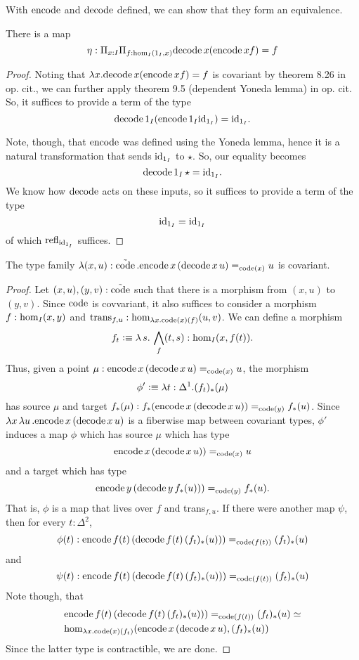 \documentclass[main.tex]{subfiles}
\begin{document}
With $\eco$ and $\dco$ defined, we can show that they form an equivalence.

\begin{lemma}
    There is a map 
    $$ \eta : \Pi_{x : I} \Pi_{f : \ho[I]{1_I}{x}} \normalfont \dco \, x (\eco \, x f) = f$$
\end{lemma}
\begin{proof}
Noting that $\lambda x .\dco \, x (\eco \, x f) = f$ is covariant by theorem 8.26 in op. cit., we can further apply theorem 9.5 (dependent Yoneda lemma) in op. cit. So, it suffices to provide a term of the type
$$\dco \, 1_I (\eco \, 1_I \id{1_I}) = \id{1_I}.$$

Note, though, that $\eco$ was defined using the Yoneda lemma, hence it is a natural transformation that sends $\id{1_I}$ to $\star$. So, our equality becomes $$
\dco \, 1_I \, \star = \id{1_I}.$$ We know how $\dco$ acts on these inputs, so it suffices to provide a term of the type
$$\id{1_I} = \id{1_I}$$
of which $\refl{\id{1_I}}$ suffices.
\end{proof}
\begin{lemma}
    The type family $\normalfont \lambda (x,u) : \tilde{\co}\,. \eco \, x \, (\dco \, x \,u)=_{\co(x)} u$ is covariant.
\end{lemma}
\begin{proof}
    Let $(x,u),(y,v) : \tilde{\co}$ such that there is a morphism from $(x,u)$ to $(y,v)$. Since $\co$ is covvariant, it also suffices to consider a morphism $f : \ho[I]{x}{y}$ and $\text{trans}_{f,u} : \ho[\lambda x. \co(x)(f)]{u}{v}$.
    We can define a morphism $$f_t \defeq \lambda \,s . \, \bigwedge_f(t,s) : \ho[I]{x}{f(t)}.$$
    Thus, given a point $\mu : \eco \, x \, (\dco \, x \,u)=_{\co(x)} u$, the morphism $$\phi' \defeq \lambda t : \Delta^1. (f_t)_*(\mu)$$ has source $\mu$ and target $f_*(\mu): f_*(\eco \, x \, (\dco \, x \,u)) =_{\co(y)} f_*(u)$. 
    Since $\lambda x\, \lambda u \,. \eco \, x \, (\dco \, x \,u)$ is a fiberwise map between covariant types, $\phi'$ induces a map $\phi$ which has source $\mu$ which has type $$\eco \, x \, (\dco \, x \,u)) =_{\co(x)} u$$ and a target which has type $$\eco \, y \, (\dco \, y \,f_*(u))) =_{\co(y)} f_*(u).$$
    That is, $\phi$ is a map that lives over $f$ and trans$_{f,u}$.
    If there were another map $\psi$, then for every $t : \Delta^2$, $$\phi(t) : \eco \, f(t) \, (\dco \, f(t) \,(f_t)_*(u))) =_{\co(f(t))} (f_t)_*(u)$$
    and
    $$\psi(t) : \eco \, f(t) \, (\dco \, f(t) \,(f_t)_*(u))) =_{\co(f(t))} (f_t)_*(u)$$
    Note though, that 
    \begin{align*}
        &\eco \, f(t) \, (\dco \, f(t) \,(f_t)_*(u))) =_{\co(f(t))} (f_t)_*(u) \simeq \\
        &\ho[\lambda x.\co(x)(f_t)]{ \eco \, x \, (\dco \, x \,u)}{ (f_t)_*(u)}
    \end{align*}
    Since the latter type is contractible, we are done.
\end{proof}
\end{document}

